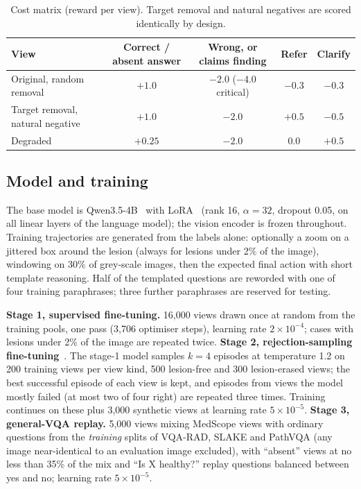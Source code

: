 \documentclass[11pt]{article}
\begin{document}
\begin{table}[t]
\centering\small\setlength{\tabcolsep}{4pt}
\caption{Cost matrix (reward per view). Target removal and natural negatives are scored identically by design.}
\label{tab:cost}
\begin{tabular}{lcccc}
\toprule
View & Correct / absent answer & Wrong, or claims finding & Refer & Clarify \\
\midrule
Original, random removal & $+1.0$ & $-2.0$ ($-4.0$ critical) & $-0.3$ & $-0.3$ \\
Target removal, natural negative & $+1.0$ & $-2.0$ & $+0.5$ & $-0.5$ \\
Degraded & $+0.25$ & $-2.0$ & $0.0$ & $+0.5$ \\
\bottomrule
\end{tabular}
\end{table}

\subsection{Model and training}\label{sec:training}
The base model is Qwen3.5-4B~\cite{qwen35} with LoRA~\cite{lora} (rank 16, $\alpha=32$, dropout 0.05, on all linear layers of the language model); the vision encoder is frozen throughout. Training trajectories are generated from the labels alone: optionally a zoom on a jittered box around the lesion (always for lesions under 2\% of the image), windowing on 30\% of grey-scale images, then the expected final action with short template reasoning. Half of the templated questions are reworded with one of four training paraphrases; three further paraphrases are reserved for testing.

\textbf{Stage 1, supervised fine-tuning.} 16,000 views drawn once at random from the training pools, one pass (3,706 optimiser steps), learning rate $2\times10^{-4}$; cases with lesions under 2\% of the image are repeated twice.
\textbf{Stage 2, rejection-sampling fine-tuning}~\cite{star,rft}. The stage-1 model samples $k=4$ episodes at temperature 1.2 on 200 training views per view kind, 500 lesion-free and 300 lesion-erased views; the best successful episode of each view is kept, and episodes from views the model mostly failed (at most two of four right) are repeated three times. Training continues on these plus 3,000 synthetic views at learning rate $5\times10^{-5}$.
\textbf{Stage 3, general-VQA replay.} 5,000 views mixing MedScope views with ordinary questions from the \emph{training} splits of VQA-RAD, SLAKE and PathVQA (any image near-identical to an evaluation image excluded), with ``absent'' views at no less than 35\% of the mix and ``Is X healthy?'' replay questions balanced between yes and no; learning rate $5\times10^{-5}$.
\end{document}
